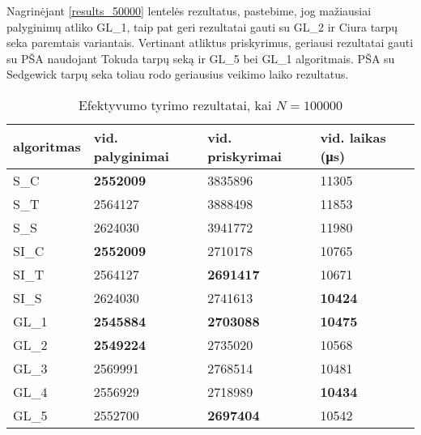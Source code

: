 \documentclass{VUMIFInfKursinis}
\begin{document}
Nagrinėjant \ref{results_50000} lentelės rezultatus, pastebime, jog
mažiausiai palyginimų atliko GL\_1, taip pat geri rezultatai gauti su GL\_2 ir Ciura tarpų seka paremtais variantais.
Vertinant atliktus priskyrimus, geriausi rezultatai gauti su PŠA naudojant Tokuda tarpų seką ir GL\_5 bei GL\_1 algoritmais.
PŠA su Sedgewick tarpų seka toliau rodo geriausius veikimo laiko rezultatus.

\begin{table}[H]
  \caption{Efektyvumo tyrimo rezultatai, kai $N = 100000$}
  \label{results_100000}
  \centering
  \begin{tabular}{llll}
    algoritmas & vid. palyginimai                         & vid. priskyrimai                         & vid. laikas (μs)                       \\ \midrule
    S\_C       & \cellcolor[HTML]{70AD47}\textbf{2552009} & 3835896                                  & 11305                                  \\
    S\_T       & 2564127                                  & 3888498                                  & 11853                                  \\
    S\_S       & 2624030                                  & 3941772                                  & 11980                                  \\
    SI\_C      & \cellcolor[HTML]{70AD47}\textbf{2552009} & 2710178                                  & 10765                                  \\
    SI\_T      & 2564127                                  & \cellcolor[HTML]{70AD47}\textbf{2691417} & 10671                                  \\
    SI\_S      & 2624030                                  & 2741613                                  & \cellcolor[HTML]{70AD47}\textbf{10424} \\
    GL\_1 & \cellcolor[HTML]{70AD47}\textbf{2545884} & \cellcolor[HTML]{70AD47}\textbf{2703088} & \cellcolor[HTML]{70AD47}\textbf{10475} \\
    GL\_2      & \cellcolor[HTML]{70AD47}\textbf{2549224} & 2735020                                  & 10568                                  \\
    GL\_3      & 2569991                                  & 2768514                                  & 10481                                  \\
    GL\_4      & 2556929                                  & 2718989                                  & \cellcolor[HTML]{70AD47}\textbf{10434} \\
    GL\_5      & 2552700                                  & \cellcolor[HTML]{70AD47}\textbf{2697404} & 10542                                  \\  \bottomrule 
  \end{tabular}
\end{table}
\end{document}
